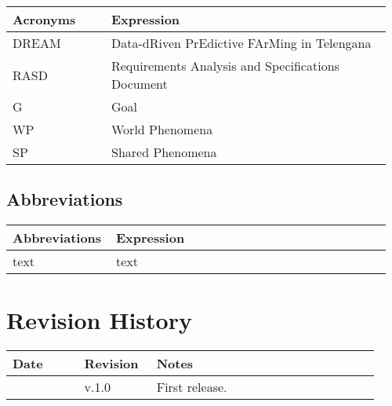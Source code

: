 \begin{center}
	\begin{tabular}{@{}p{0.25\linewidth} p{0.71\linewidth}@{}}
		\toprule
		\textbf{Acronyms}   & \textbf{Expression}\\
		\midrule
		DREAM               & Data-dRiven PrEdictive FArMing in Telengana\\
		RASD                & Requirements Analysis and Specifications Document\\
		G                   & Goal\\
		WP                  & World Phenomena\\
		SP                  & Shared Phenomena\\
		\bottomrule
	\end{tabular}
\end{center}

\subsection{Abbreviations}
\begin{center}
	\begin{tabular}{@{}p{0.25\linewidth} p{0.71\linewidth}@{}}
		\toprule
		\textbf{Abbreviations}  & \textbf{Expression}\\
		\midrule
	    text & text\\
		\bottomrule
	\end{tabular}
\end{center}

\section{Revision History}

\begin{center}
	\begin{tabular}{@{}p{0.18\linewidth} p{0.18\linewidth} p{0.57\linewidth}@{}}
		\toprule
		\textbf{Date}   & \textbf{Revision} & \textbf{Notes}\\
		\midrule
		\date{}         & v.1.0             & First release.\\
		\bottomrule
	\end{tabular}
\end{center}

